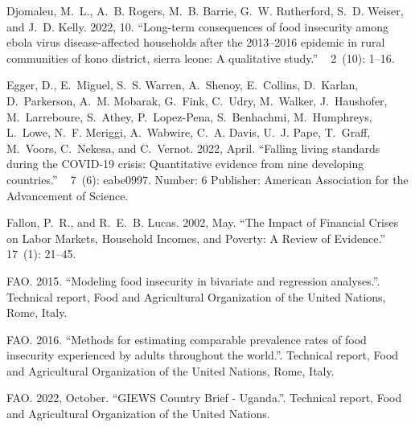 \documentclass{wber}
\begin{document}
\begin{thebibliography}{}
Djomaleu, M.~L., A.~B. Rogers, M.~B. Barrie, G.~W. Rutherford, S.~D. Weiser,
  and J.~D. Kelly. 2022, 10.
\newblock ``Long-term consequences of food insecurity among ebola virus
  disease-affected households after the 2013--2016 epidemic in rural
  communities of kono district, sierra leone: A qualitative study.''
~{ 2\/}~(10): 1--16.

Egger, D., E.~Miguel, S.~S. Warren, A.~Shenoy, E.~Collins, D.~Karlan,
  D.~Parkerson, A.~M. Mobarak, G.~Fink, C.~Udry, M.~Walker, J.~Haushofer,
  M.~Larreboure, S.~Athey, P.~Lopez-Pena, S.~Benhachmi, M.~Humphreys, L.~Lowe,
  N.~F. Meriggi, A.~Wabwire, C.~A. Davis, U.~J. Pape, T.~Graff, M.~Voors,
  C.~Nekesa, and C.~Vernot. 2022, April.
\newblock ``Falling living standards during the {COVID}-19 crisis:
  {Quantitative} evidence from nine developing countries.''
~{ 7\/}~(6): eabe0997.
\newblock Number: 6 Publisher: American Association for the Advancement of
  Science.

Fallon, P.~R., and R.~E.~B. Lucas. 2002, May.
\newblock ``The {Impact} of {Financial} {Crises} on {Labor} {Markets},
  {Household} {Incomes}, and {Poverty}: {A} {Review} of {Evidence}.''
~{ 17\/}~(1): 21--45.

FAO. 2015.
\newblock ``Modeling food insecurity in bivariate and regression analyses.''.
\newblock Technical report, {Food and Agricultural Organization of the United
  Nations}, Rome, Italy.

FAO. 2016.
\newblock ``Methods for estimating comparable prevalence rates of food
  insecurity experienced by adults throughout the world.''.
\newblock Technical report, {Food and Agricultural Organization of the United
  Nations}, Rome, Italy.

FAO. 2022, October.
\newblock ``{GIEWS} {Country} {Brief} - {Uganda}.''.
\newblock Technical report, Food and Agricultural Organization of the United
  Nations.


\end{thebibliography}
\end{document}
